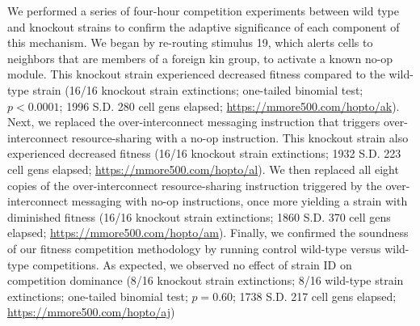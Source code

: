 We performed a series of four-hour competition experiments between wild type and knockout strains to confirm the adaptive significance of each component of this mechanism.
We began by re-routing stimulus 19, which alerts cells to neighbors that are members of a foreign kin group, to activate a known no-op module.
This knockout strain experienced decreased fitness compared to the wild-type strain (16/16 knockout strain extinctions; one-tailed binomial test; $p < 0.0001$; 1996 S.D. 280 cell gens elapsed; \url{https://mmore500.com/hopto/ak}).
Next, we replaced the over-interconnect messaging instruction that triggers over-interconnect resource-sharing with a no-op instruction.
This knockout strain also experienced decreased fitness (16/16 knockout strain extinctions; 1932 S.D. 223 cell gens elapsed; \url{https://mmore500.com/hopto/al}).
We then replaced all eight copies of the over-interconnect resource-sharing instruction triggered by the over-interconnect messaging with no-op instructions, once more yielding a strain with diminished fitness (16/16 knockout strain extinctions; 1860 S.D. 370 cell gens elapsed; \url{https://mmore500.com/hopto/am}).
Finally, we confirmed the soundness of our fitness competition methodology by running control wild-type versus wild-type competitions.
As expected, we observed no effect of strain ID on competition dominance (8/16 knockout strain extinctions; 8/16 wild-type strain extinctions; one-tailed binomial test; $p = 0.60$; 1738 S.D. 217 cell gens elapsed; \url{https://mmore500.com/hopto/aj})

